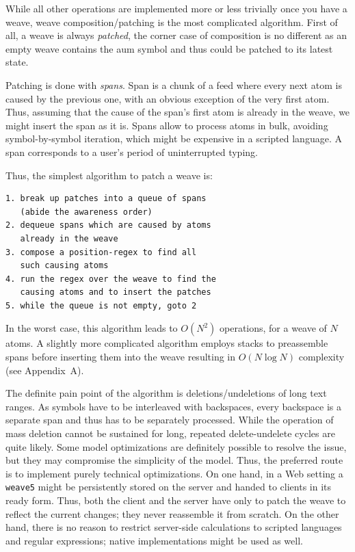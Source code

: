 \documentclass[twocolumn]{article}
\begin{document}
While all other operations are implemented more or less trivially once you have a weave, weave composition/patching is the most complicated algorithm. First of all, a weave is always \emph{patched}, the corner case of composition is no different as an empty weave contains the aum symbol and thus could be patched to its latest state.

Patching is done with \emph{spans}. Span is a chunk of a feed where every next atom is caused by the previous one, with an obvious exception of the very first atom. Thus, assuming that the cause of the span's first atom is already in the weave, we might insert the span as it is.
Spans allow to process atoms in bulk, avoiding symbol-by-symbol iteration, which might be expensive in a scripted language. A span corresponds to a user's period of uninterrupted typing.

Thus, the  simplest algorithm to patch a weave is:
\begin{verbatim}
1. break up patches into a queue of spans
   (abide the awareness order)
2. dequeue spans which are caused by atoms
   already in the weave
3. compose a position-regex to find all
   such causing atoms
4. run the regex over the weave to find the
   causing atoms and to insert the patches
5. while the queue is not empty, goto 2
\end{verbatim}
In the worst case, this algorithm leads to $O(N^{2})$ operations, for a weave of $N$ atoms.
A slightly more complicated algorithm employs stacks to preassemble spans before inserting them into the weave resulting in $O(N\log N)$ complexity (see Appendix~A).

The definite pain point of the algorithm is deletions/undeletions of long text ranges. As symbols have to be interleaved with backspaces, every backspace is a separate span and thus has to be separately processed. While the operation of mass deletion cannot be sustained for long, repeated delete-undelete cycles are quite likely. Some model optimizations are definitely possible to resolve the issue, but they may compromise the simplicity of the model. Thus, the preferred route is to implement purely technical optimizations. On one hand, in a Web setting a {\tt weave5} might be persistently stored on the server and handed to clients in its ready form. Thus, both the client and the server have only to patch the weave to reflect the current changes; they never reassemble it from scratch. On the other hand, there is no reason to restrict server-side calculations to scripted languages and regular expressions; native implementations might be used as well.
\end{document}
